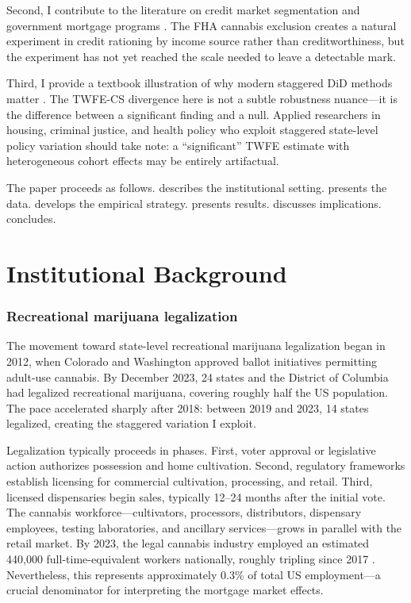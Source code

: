 \documentclass[12pt]{article}
\begin{document}
Second, I contribute to the literature on credit market segmentation and government mortgage programs \citep{adelino2012, bhutta2015, demyanyk2011, fuster2019, gabriel2020}. The FHA cannabis exclusion creates a natural experiment in credit rationing by income source rather than creditworthiness, but the experiment has not yet reached the scale needed to leave a detectable mark.

Third, I provide a textbook illustration of why modern staggered DiD methods matter \citep{callaway2021, goodman-bacon2021, dechaisemartin2020, sun2021, borusyak2024}. The TWFE-CS divergence here is not a subtle robustness nuance---it is the difference between a significant finding and a null. Applied researchers in housing, criminal justice, and health policy who exploit staggered state-level policy variation should take note: a ``significant'' TWFE estimate with heterogeneous cohort effects may be entirely artifactual.

The paper proceeds as follows.  describes the institutional setting.  presents the data.  develops the empirical strategy.  presents results.  discusses implications.  concludes.

\section{Institutional Background}
\label{sec:background}

\subsubsection*{Recreational marijuana legalization} The movement toward state-level recreational marijuana legalization began in 2012, when Colorado and Washington approved ballot initiatives permitting adult-use cannabis. By December 2023, 24 states and the District of Columbia had legalized recreational marijuana, covering roughly half the US population. The pace accelerated sharply after 2018: between 2019 and 2023, 14 states legalized, creating the staggered variation I exploit.

Legalization typically proceeds in phases. First, voter approval or legislative action authorizes possession and home cultivation. Second, regulatory frameworks establish licensing for commercial cultivation, processing, and retail. Third, licensed dispensaries begin sales, typically 12--24 months after the initial vote. The cannabis workforce---cultivators, processors, distributors, dispensary employees, testing laboratories, and ancillary services---grows in parallel with the retail market. By 2023, the legal cannabis industry employed an estimated 440,000 full-time-equivalent workers nationally, roughly tripling since 2017 \citep{leafly2024}. Nevertheless, this represents approximately 0.3\% of total US employment---a crucial denominator for interpreting the mortgage market effects.
\end{document}
